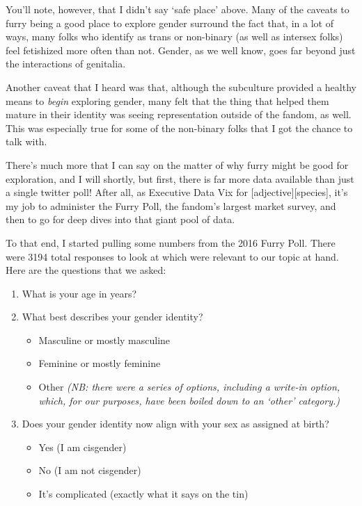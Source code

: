 You'll note, however, that I didn't say `safe place' above.  Many of the caveats to furry being a good place to explore gender surround the fact that, in a lot of ways, many folks who identify as trans or non-binary (as well as intersex folks) feel fetishized more often than not.  Gender, as we well know, goes far beyond just the interactions of genitalia.

Another caveat that I heard was that, although the subculture provided a healthy means to \textit{begin} exploring gender, many felt that the thing that helped them mature in their identity was seeing representation outside of the fandom, as well.  This was especially true for some of the non-binary folks that I got the chance to talk with.

There's much more that I can say on the matter of why furry might be good for exploration, and I will shortly, but first, there is far more data available than just a single twitter poll!  After all, as Executive Data Vix for [adjective][species], it's my job to administer the Furry Poll, the fandom's largest market survey, and then to go for deep dives into that giant pool of data.

To that end, I started pulling some numbers from the 2016 Furry Poll.  There were 3194 total responses to look at which were relevant to our topic at hand.  Here are the questions that we asked:

\begin{enumerate}
  \item What is your age in years?
  \item What best describes your gender identity?
  \begin{itemize}
    \item Masculine or mostly masculine
    \item Feminine or mostly feminine
    \item Other \textit{(NB: there were a series of options, including a write-in option, which, for our purposes, have been boiled down to an `other' category.)}
  \end{itemize}
  \item Does your gender identity now align with your sex as assigned at birth?
  \begin{itemize}
    \item Yes (I am cisgender)
    \item No (I am not cisgender)
    \item It's complicated (exactly what it says on the tin)
  \end{itemize}
\end{enumerate}

